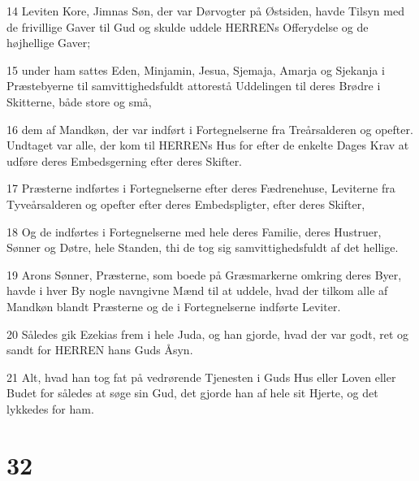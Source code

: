 \par 14 Leviten Kore, Jimnas Søn, der var Dørvogter på Østsiden, havde Tilsyn med de frivillige Gaver til Gud og skulde uddele HERRENs Offerydelse og de højhellige Gaver;
\par 15 under ham sattes Eden, Minjamin, Jesua, Sjemaja, Amarja og Sjekanja i Præstebyerne til samvittighedsfuldt attorestå Uddelingen til deres Brødre i Skitterne, både store og små,
\par 16 dem af Mandkøn, der var indført i Fortegnelserne fra Treårsalderen og opefter. Undtaget var alle, der kom til HERRENs Hus for efter de enkelte Dages Krav at udføre deres Embedsgerning efter deres Skifter.
\par 17 Præsterne indførtes i Fortegnelserne efter deres Fædrenehuse, Leviterne fra Tyveårsalderen og opefter efter deres Embedspligter, efter deres Skifter,
\par 18 Og de indførtes i Fortegnelserne med hele deres Familie, deres Hustruer, Sønner og Døtre, hele Standen, thi de tog sig samvittighedsfuldt af det hellige.
\par 19 Arons Sønner, Præsterne, som boede på Græsmarkerne omkring deres Byer, havde i hver By nogle navngivne Mænd til at uddele, hvad der tilkom alle af Mandkøn blandt Præsterne og de i Fortegnelserne indførte Leviter.
\par 20 Således gik Ezekias frem i hele Juda, og han gjorde, hvad der var godt, ret og sandt for HERREN hans Guds Åsyn.
\par 21 Alt, hvad han tog fat på vedrørende Tjenesten i Guds Hus eller Loven eller Budet for således at søge sin Gud, det gjorde han af hele sit Hjerte, og det lykkedes for ham.

\chapter{32}

